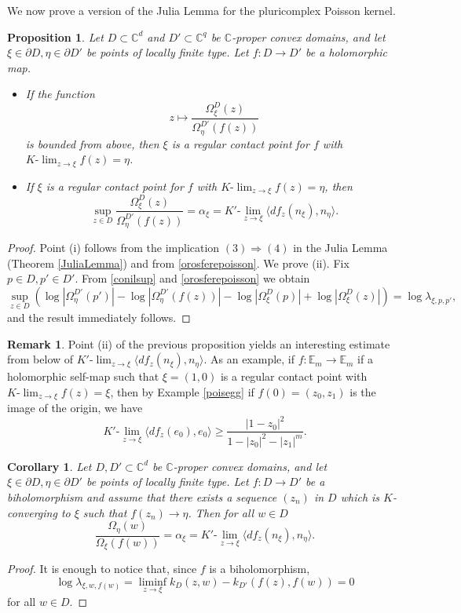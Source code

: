 \documentclass[11pt, reqno]{amsart}
\numberwithin{equation}{section}
\newtheorem{corollary}[theorem]{Corollary}
\newtheorem{proposition}[theorem]{Proposition}
\theoremstyle{definition}
\newtheorem{remark}[theorem]{Remark}
\newcommand{\C}{\mathbb{C}}
\begin{document}
{{{		
		We now prove a version of the Julia Lemma for  the pluricomplex Poisson kernel. 
		\begin{proposition}
			Let $D\subset\C^d$ and $D'\subset\C^{q}$ be  $\C$-proper convex domains, and  let $\xi\in \partial D,\eta\in \partial D' $ be  points of locally finite type.
			Let $f\colon D\to D'$ be a holomorphic map. \begin{itemize}
				\item[(i)] If the function $$z\mapsto \frac{\Omega^D_\xi(z)}{\Omega^{D'}_\eta(f(z))}$$ is bounded from above, then 
				$\xi$ is a regular contact point for $f$ with  $K\textrm{-}\lim_{z\to\xi}f(z)=\eta$.
				\item[(ii)] If  $\xi$ is a regular contact point for $f$ with  $K\textrm{-}\lim_{z\to\xi}f(z)=\eta$, then
				$$\sup_{z\in D}\frac{\Omega^D_\xi(z)}{\Omega^{D'}_\eta(f(z))}=\alpha_\xi=K'\textrm{-}\lim_{z\to\xi}\langle df_z(n_\xi),n_\eta\rangle.$$ 
			\end{itemize}
		\end{proposition}
		\begin{proof}
Point (i) follows from the implication $(3)\Rightarrow(4)$ in the Julia Lemma (Theorem \ref{JuliaLemma}) and from \eqref{orosferepoisson}.
			We prove (ii). Fix $p\in D,p'\in D'$.
			From  \eqref{conilsup} and  \eqref{orosferepoisson} we obtain
			$$\sup_{z\in D}\left(\log|\Omega^{D'}_\eta(p')|-\log|\Omega^{D'}_\eta(f(z))|- \log|\Omega^{D}_\xi(p)|+\log|\Omega^{D}_\xi(z)|\right)=\log\lambda_{\xi,p,p'},$$
			and the result immediately follows.
		\end{proof}
		\begin{remark}
			Point (ii) of the previous proposition  yields an interesting estimate from below of $K'\textrm{-}\lim_{z\to\xi}\langle df_z(n_\xi),n_\eta\rangle$.
			As an example, if $f\colon\mathbb{E}_m\to\mathbb{E}_m$ if a holomorphic self-map such that $\xi=(1,0)$ is a regular contact point with
			$K\textrm{-}\lim_{z\to\xi}f(z)=\xi$,  then by Example \ref{poisegg} if $f(0)=(z_0,z_1)$ is the image of the origin, we have
			$$K'\textrm{-}\lim_{z\to\xi}\langle df_z(e_0),e_0\rangle \geq\frac{|1-z_0|^2}{1-|z_0|^2-|z_1|^m}.$$
		\end{remark}
		
		
		\begin{corollary}
			Let $D,D'\subset \C^d$ be  $\C$-proper convex domains, and let $\xi\in\partial D,\eta\in \partial D' $ be  points of locally finite type. Let $f\colon D\to D'$ be a biholomorphism and assume that there exists a sequence $(z_n)$ in $D$ which is $K$-converging to $\xi$ such that $f(z_n)\to \eta$. Then for all $w\in D$
			$$\frac{\Omega_\eta(w)}{\Omega_\xi(f(w))}=\alpha_\xi=K'\textrm{-}\lim_{z\to\xi}\langle df_z(n_\xi),n_\eta\rangle.$$
		\end{corollary}
		\begin{proof}
			It is enough to notice that, since $f$ is a biholomorphism,  
			$$\log\lambda_{\xi,w,f(w)}=\liminf_{z\to\xi} k_D(z,w)-k_{D'}(f(z),f(w))=0$$  for all $w\in D$.
		\end{proof}
		
}}}
\end{document}
